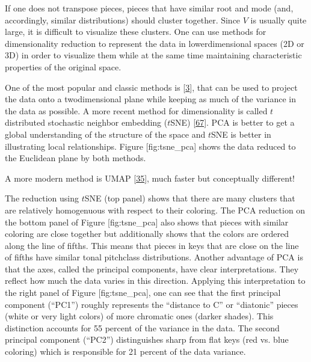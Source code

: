 \documentclass[letterpaper,10pt,english]{sphinxmanual}
\begin{document}
\sphinxAtStartPar
If one does not transpose pieces, pieces that have similar root and mode
(and, accordingly, similar distributions) should cluster together. Since
\(V\) is usually quite large, it is difficult to visualize these
clusters. One can use methods for dimensionality reduction to represent
the data in lower\sphinxhyphen{}dimensional spaces (2D or 3D) in order to visualize
them while at the same time maintaining characteristic properties of the
original space.

\sphinxAtStartPar
One of the most popular and classic methods is  {[}\hyperlink{cite.8_bibliography:id74}{3}{]}, that can be used to project
the data onto a two\sphinxhyphen{}dimensional plane while keeping as much of the
variance in the data as possible. A more recent method for
dimensionality is called \(t\)\sphinxhyphen{}distributed stochastic neighbor
embedding (\(t\)\sphinxhyphen{}SNE) {[}\hyperlink{cite.8_bibliography:id76}{67}{]}. PCA is
better to get a global understanding of the structure of the space and
\(t\)\sphinxhyphen{}SNE is better in illustrating local relationships. Figure
{[}fig:tsne\_pca{]} shows the data reduced to the Euclidean plane by both
methods.

\sphinxAtStartPar
A more modern method is UMAP {[}\hyperlink{cite.8_bibliography:id75}{35}{]}, much faster but conceptually different!

\sphinxAtStartPar
The reduction using \(t\)\sphinxhyphen{}SNE (top panel) shows that there are many
clusters that are relatively homogenuous with respect to their coloring.
The PCA reduction on the bottom panel of Figure {[}fig:tsne\_pca{]} also
shows that pieces with similar coloring are close together but
additionally shows that the colors are ordered along the line of fifths.
This means that pieces in keys that are close on the line of fifths have
similar tonal pitch\sphinxhyphen{}class distributions. Another advantage of PCA is
that the axes, called the principal components, have clear
interpretations. They reflect how much the data varies in this
direction. Applying this interpretation to the right panel of Figure
{[}fig:tsne\_pca{]}, one can see that the first principal component (“PC1”)
roughly represents the “distance to C” or “diatonic” pieces (white or
very light colors) of more chromatic ones (darker shades). This
distinction accounts for 55 percent of the variance in the data. The
second principal component (“PC2”) distinguishes sharp from flat keys
(red vs. blue coloring) which is responsible for 21 percent of the data
variance.
\end{document}
